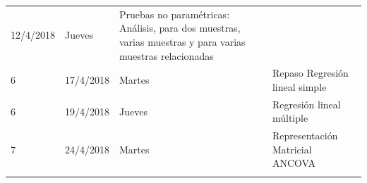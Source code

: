 \documentclass[]{book}
\theoremstyle{definition}
\theoremstyle{definition}
\theoremstyle{definition}
\theoremstyle{remark}
\begin{document}
\begin{longtable}[]{@{}llll@{}}
\begin{minipage}[t]{0.07\columnwidth}
12/4/2018\strut
\end{minipage} & \begin{minipage}[t]{0.05\columnwidth}\raggedright
Jueves\strut
\end{minipage} & \begin{minipage}[t]{0.71\columnwidth}\raggedright
Pruebas no paramétricas: Análisis, para dos muestras, varias muestras y
para varias muestras relacionadas\strut
\end{minipage}\tabularnewline
\begin{minipage}[t]{0.05\columnwidth}\raggedright
6\strut
\end{minipage} & \begin{minipage}[t]{0.07\columnwidth}\raggedright
17/4/2018\strut
\end{minipage} & \begin{minipage}[t]{0.05\columnwidth}\raggedright
Martes\strut
\end{minipage} & \begin{minipage}[t]{0.71\columnwidth}\raggedright
Repaso Regresión lineal simple\strut
\end{minipage}\tabularnewline
\begin{minipage}[t]{0.05\columnwidth}\raggedright
6\strut
\end{minipage} & \begin{minipage}[t]{0.07\columnwidth}\raggedright
19/4/2018\strut
\end{minipage} & \begin{minipage}[t]{0.05\columnwidth}\raggedright
Jueves\strut
\end{minipage} & \begin{minipage}[t]{0.71\columnwidth}\raggedright
Regresión lineal múltiple\strut
\end{minipage}\tabularnewline
\begin{minipage}[t]{0.05\columnwidth}\raggedright
7\strut
\end{minipage} & \begin{minipage}[t]{0.07\columnwidth}\raggedright
24/4/2018\strut
\end{minipage} & \begin{minipage}[t]{0.05\columnwidth}\raggedright
Martes\strut
\end{minipage} & \begin{minipage}[t]{0.71\columnwidth}\raggedright
Representación Matricial ANCOVA\strut
\end{minipage}\tabularnewline
\begin{minipage}[t]{0.05\columnwidth}\raggedright

\end{minipage}
\end{longtable}
\end{document}
